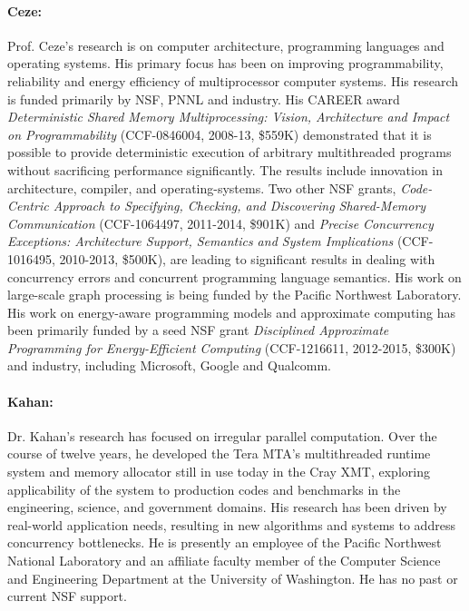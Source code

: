 \paragraph{Ceze:} Prof. Ceze's research is on computer architecture, programming languages and operating systems. His primary focus has been on improving programmability, reliability and energy efficiency of multiprocessor computer systems. His research is funded primarily by NSF, PNNL and industry. His CAREER award {\em Deterministic Shared Memory Multiprocessing: Vision, Architecture and Impact on Programmability} (CCF-0846004, 2008-13, \$559K) demonstrated that it is possible to provide deterministic execution of arbitrary multithreaded programs without sacrificing performance significantly. The results include innovation in architecture, compiler, and operating-systems. Two other NSF grants, {\em Code-Centric Approach to Specifying, Checking, and Discovering Shared-Memory Communication} (CCF-1064497, 2011-2014, \$901K) and {\em Precise Concurrency Exceptions: Architecture Support, Semantics and System Implications} (CCF-1016495, 2010-2013, \$500K), are leading to significant results in dealing with concurrency errors and concurrent programming language semantics. His work on large-scale graph processing is being funded by the Pacific Northwest Laboratory. His work on energy-aware programming models and approximate computing has been primarily funded by a seed NSF grant {\em Disciplined Approximate Programming for Energy-Efficient Computing} (CCF-1216611, 2012-2015, \$300K) and industry, including Microsoft, Google and Qualcomm.

\paragraph{Kahan:} Dr. Kahan's research has focused on irregular parallel computation.  Over the course of twelve years, he developed the Tera MTA's multithreaded runtime system and memory allocator still in use today in the Cray XMT, exploring applicability of the system to production codes and benchmarks in the engineering, science, and government domains.  His research has been driven by real-world application needs, resulting in new algorithms and systems to address concurrency bottlenecks.  He is presently an employee of the Pacific Northwest National Laboratory and an affiliate faculty member of the Computer Science and Engineering Department at the University of Washington.  He has no past or current NSF support.

